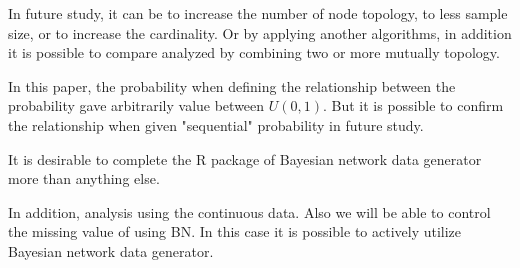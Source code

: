 In future study, it can be to increase the number of node topology, to less sample size, or to increase the cardinality. Or by applying another algorithms, in addition it is possible to compare analyzed by combining two or more mutually topology.

In this paper, the probability when defining the relationship between the probability gave arbitrarily value between $U(0,1)$. But it is possible to confirm the relationship when given "sequential" probability in future study.

It is desirable to complete the R package of Bayesian network data generator more than anything else.

In addition, analysis using the continuous data. Also we will be able to control the missing value of using BN. In this case it is possible to actively utilize Bayesian network data generator.